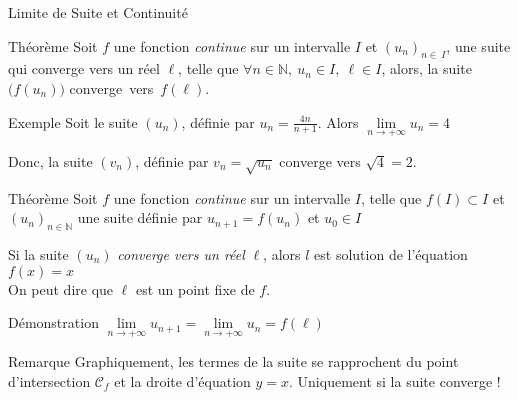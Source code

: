\documentclass{cours}
\begin{document}
    \begin{Gpartie}{Limite de Suite et Continuité} 
        \begin{Spartie}{Théorème} 
            Soit $f$ une fonction \emph{continue} sur un intervalle $I$ et $(u_n)_{n\in\ I}$, une suite qui converge vers un réel $\ell$, telle que $\forall n\in\mathbb{N},\ u_n\in I,~\ell\in I$, alors, la suite $\big(f(u_n)\big)$ converge~vers~$f(\ell)$.
            \begin{SSpartie}{Exemple} 
                Soit le suite $(u_n)$, définie par $u_n=\frac{4n}{n+1}$. Alors $\lim\limits_{n\to +\infty}u_n=4$
                
                Donc, la suite $(v_n)$, définie par $v_n=\sqrt{u_n}$ converge vers $\sqrt{4}=2$.
            \end{SSpartie}
        \end{Spartie}
        \begin{Spartie}{Théorème}
            Soit $f$ une fonction \emph{continue} sur un intervalle $I$, telle que $f(I)\subset I$ et $(u_n)_{n\in\mathbb{N}}$ une suite définie par $u_{n+1}=f(u_n)$ et $u_0\in I$
            
            Si la suite $(u_n)$ \emph{converge vers un réel} $\ell$, alors $l$ est solution de l'équation $f(x)=x$ \\ On peut dire que $\ell$ est un point fixe de $f$.
            \begin{SSpartie}{Démonstration} 
                $\lim\limits_{n\to +\infty}u_{n+1}=\lim\limits_{n\to +\infty}u_n=f(\ell)$
            \end{SSpartie}
            \begin{SSpartie}{Remarque} 
                Graphiquement, les termes de la suite se rapprochent du point d'intersection $\mathcal{C}_f$ et la droite d'équation $y=x$. Uniquement si la suite converge !
                \begin{center}
\end{center}
\end{SSpartie}
\end{Spartie}
\end{Gpartie}
\end{document}
